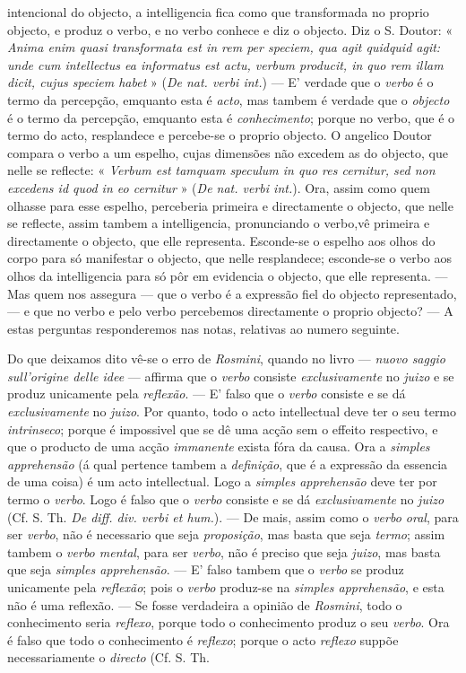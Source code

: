 intencional do objecto, a intelligencia fica como que transformada no proprio objecto, e produz o verbo, e no verbo conhece e diz o objecto. Diz o S. Doutor: « \emph{Anima enim quasi transformata est in rem per speciem, qua agit quidquid agit: unde cum intellectus ea informatus est actu, verbum producit, in quo rem illam dicit, cujus speciem habet} » (\emph{De nat. verbi int.}) --- E' verdade que o \emph{verbo} é o termo da percepção, emquanto esta é \emph{acto}, mas tambem é verdade que o \emph{objecto} é o termo da percepção, emquanto esta é \emph{conhecimento}; porque no verbo, que é o termo do acto, resplandece e percebe-se o proprio objecto. O angelico Doutor compara o verbo a um espelho, cujas dimensões não excedem as do objecto, que nelle se reflecte: « \emph{Verbum est tamquam speculum in quo res cernitur, sed non excedens id quod in eo cernitur} » (\emph{De nat. verbi int.}). Ora, assim como quem olhasse para esse espelho, perceberia primeira e directamente o objecto, que nelle se reflecte, assim tambem a intelligencia, pronunciando o verbo,vê primeira e directamente o objecto, que elle representa. Esconde-se o espelho aos olhos do corpo para só manifestar o objecto, que nelle resplandece; esconde-se o verbo aos olhos da intelligencia para só pôr em evidencia o objecto, que elle representa. --- Mas quem nos assegura --- que o verbo é a expressão fiel do objecto representado, --- e que no verbo e pelo verbo percebemos directamente o proprio objecto? --- A estas perguntas responderemos nas notas, relativas ao numero seguinte.\par Do que deixamos dito vê-se o erro de \emph{Rosmini}, quando no livro --- \emph{nuovo saggio sull'origine delle idee} --- affirma que o \emph{verbo} consiste \emph{exclusivamente} no \emph{juizo} e se produz unicamente pela \emph{reflexão}. --- E' falso que o \emph{verbo} consiste e se dá \emph{exclusivamente} no \emph{juizo}. Por quanto, todo o acto intellectual deve ter o seu termo \emph{intrinseco}; porque é impossivel que se dê uma acção sem o effeito respectivo, e que o producto de uma acção \emph{immanente} exista fóra da causa. Ora a \emph{simples apprehensão} (á qual pertence tambem a \emph{definição}, que é a expressão da essencia de uma coisa) é um acto intellectual. Logo a \emph{simples apprehensão} deve ter por termo o \emph{verbo}. Logo é falso que o \emph{verbo} consiste e se dá \emph{exclusivamente} no \emph{juizo} (Cf. S. Th. \emph{De diff. div. verbi et hum.}). --- De mais, assim como o \emph{verbo oral}, para ser \emph{verbo}, não é necessario que seja \emph{proposição}, mas basta que seja \emph{termo}; assim tambem o \emph{verbo mental}, para ser \emph{verbo}, não é preciso que seja \emph{juizo}, mas basta que seja \emph{simples apprehensão}. --- E' falso tambem que o \emph{verbo} se produz unicamente pela \emph{reflexão}; pois o \emph{verbo} produz-se na \emph{simples apprehensão}, e esta não é uma reflexão. --- Se fosse verdadeira a opinião de \emph{Rosmini}, todo o conhecimento seria \emph{reflexo}, porque todo o conhecimento produz o seu \emph{verbo}. Ora é falso que todo o conhecimento é \emph{reflexo}; porque o acto \emph{reflexo} suppõe necessariamente o \emph{directo} (Cf. S. Th. 